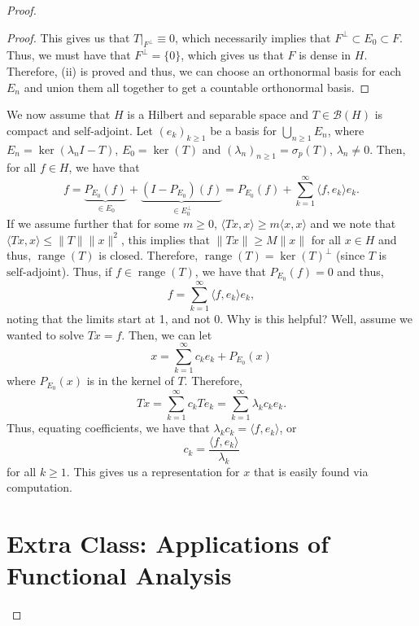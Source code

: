 \documentclass[oneside]{book}
\newcommand{\B}{\mathscr{B}}
\newcommand{\la}{\langle}
\newcommand{\ra}{\rangle}
\DeclareMathOperator{\range}{range}
\newcommand{\sbs}{\subset}
\newcommand{\saj}{\text{self-adjoint}}
\begin{document}
\begin{proof}
\begin{proof}
\indent This gives us that $T \vert_{F^{\perp}} \equiv 0$, which necessarily implies that $F^{\perp} \sbs E_0 \sbs F$. Thus, we must have that $F^{\perp} = \{ 0 \}$, which gives us that $F$ is dense in $H$. Therefore, (ii) is proved and thus, we can choose an orthonormal basis for each $E_n$ and union them all together to get a countable orthonormal basis. 
\end{proof}
We now assume that $H$ is a Hilbert and separable space and $T \in \B(H)$ is compact and $\saj$. Let $(e_k)_{k \geq 1}$ be a basis for $\bigcup\limits_{n \geq 1} E_n$, where $E_n = \ker(\lambda_n I - T)$, $E_0 = \ker(T)$ and $(\lambda_n)_{n \geq 1} = \sigma_p(T)$, $\lambda_n \neq 0$. Then, for all $f \in H$, we have that 
\[f = \underbrace{P_{E_0}(f)}_{\in E_0} + \underbrace{( I - P_{E_0})(f)}_{\in E_0^{\perp}} = P_{E_0}(f) + \sum\limits_{k = 1}^{\infty} \la f, e_k \ra e_k.\]
If we assume further that for some $m \geq 0$, $\la Tx, x \ra \geq m\la x, x \ra$ and we note that $\la Tx, x \ra \leq \| T \| \| x \|^2$, this implies that $\| Tx \| \geq M \| x\|$ for all $x \in H$ and thus, $\range(T)$ is closed. Therefore, $\range(T) = \ker(T)^{\perp}$ (since $T$ is $\saj$). Thus, if $f \in \range(T)$, we have that $P_{E_0}(f) = 0$ and thus, 
\[ f = \sum\limits_{k = 1}^{\infty} \la f, e_k \ra e_k, \]
noting that the limits start at 1, and not 0. Why is this helpful? Well, assume we wanted to solve $Tx = f$. Then, we can let 
\[ x = \sum\limits_{k = 1}^{\infty} c_k e_k + P_{E_0} (x)\]
where $ P_{E_0} (x)$ is in the kernel of $T$. Therefore, 
\[ Tx = \sum\limits_{k = 1}^{\infty} c_k T e_k = \sum\limits_{k = 1}^{\infty} \lambda_k c_k e_k.\]
Thus, equating coefficients, we have that $\lambda_k c_k = \la f, e_k \ra$, or 
\[ c_k = \frac{\la f, e_k \ra}{\lambda_k}\]
for all $k \geq 1$. This gives us a representation for $x$ that is easily found via computation.
\section*{Extra Class: Applications of Functional Analysis}
 \setcounter{theorem}{0}
 \setcounter{proposition}{0}
  \setcounter{definition}{0}
 \setcounter{corollary}{0}
 \setcounter{cons}{0}
 \setcounter{equation}{0}
 \setcounter{lemma}{0}

\end{proof}
\end{document}
